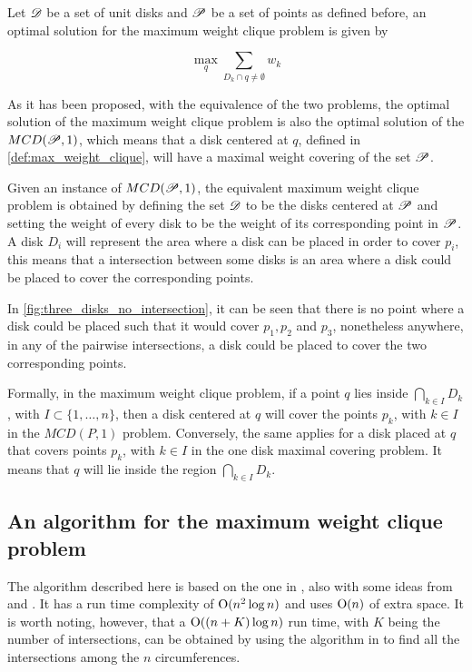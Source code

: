\begin{definicao}\label{def:max_weight_clique}
    Let $\mathscr{D}$ be a set of unit disks and $\mathscr{P}$ be a set of points as defined before, an optimal solution for the maximum weight clique problem is given by 
    
    \begin{equation}
        \max_q \sum_{D_k \cap q \neq \emptyset} w_k
    \end{equation}

\end{definicao}

As it has been proposed, with the equivalence of the two problems, the optimal solution of the maximum weight clique problem is also the optimal solution of the $MCD(\mathscr{P},1)$, which means that a disk centered at $q$, defined in \autoref{def:max_weight_clique}, will have a maximal weight covering of the set $\mathscr{P}$.

Given an instance of $MCD(\mathscr{P},1)$, the equivalent maximum weight clique problem is obtained by defining the set $\mathscr{D}$ to be the disks centered at $\mathscr{P}$ and setting the weight of every disk to be the weight of its corresponding point in $\mathscr{P}$. A disk $D_i$ will represent the area where a disk can be placed in order to cover $p_i$, this means that a intersection between some disks is an area where a disk could be placed to cover the corresponding points.

In \autoref{fig:three_disks_no_intersection}, it can be seen that there is no point where a disk could be placed such that it would cover $p_1, p_2$ and $p_3$, nonetheless anywhere, in any of the pairwise intersections, a disk could be placed to cover the two corresponding points.

Formally, in the maximum weight clique problem, if a point $q$ lies inside $\bigcap_{k \in I} D_k$, with $I \subset \{1,\dots,n\}$, then a disk centered at $q$ will cover the points $p_k$, with $k\in I$ in the $MCD(P,1)$ problem. Conversely, the same applies for a disk placed at $q$ that covers points $p_k$, with $k \in I$ in the one disk maximal covering problem. It means that $q$ will lie inside the region $\bigcap_{k \in I} D_k$.

\subsection{An algorithm for the maximum weight clique problem}

The algorithm described here is based on the one in \cite{drezner}, also with some ideas from \cite{inplace:2014} and \cite{cabello:2006}. It has a run time complexity of $\mathrm{O}(n^2\log{n})$ and uses $\mathrm{O}(n)$ of extra space. It is worth noting, however, that a $\mathrm{O}((n+K)\log{n})$ run time, with $K$ being the number of intersections, can be obtained by using the algorithm in \cite{bentley:1979} to find all the intersections among the $n$ circumferences.

